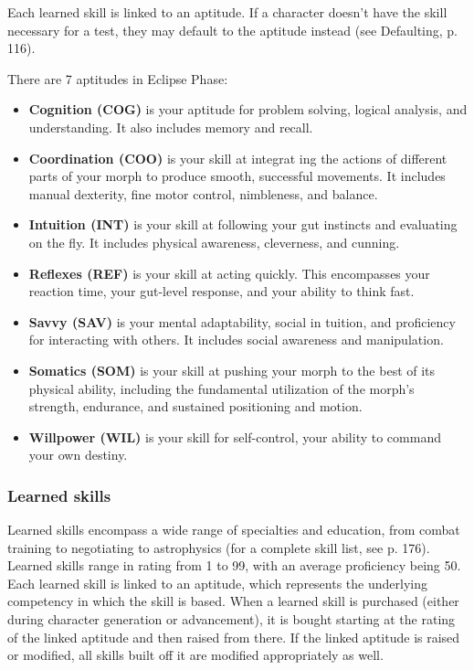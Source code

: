 Each learned skill is linked to an aptitude. If a character doesn't have the skill necessary for a test, they may default to the aptitude instead (see Defaulting, p. 116).

There are 7 aptitudes in Eclipse Phase:

\begin{itemize}
\item \textbf{Cognition (COG)} is your aptitude for problem solving, logical analysis, and understanding. It also includes memory and recall.
\item \textbf{Coordination (COO)} is your skill at integrat ing the actions of different parts of your morph to produce smooth, successful movements. It includes manual dexterity, fine motor control, nimbleness, and balance.
\item \textbf{Intuition (INT)} is your skill at following your gut instincts and evaluating on the fly. It includes physical awareness, cleverness, and cunning.
\item \textbf{Reflexes (REF)} is your skill at acting quickly. This encompasses your reaction time, your gut-level response, and your ability to think fast.
\item \textbf{Savvy (SAV)} is your mental adaptability, social in tuition, and proficiency for interacting with others. It includes social awareness and manipulation.
\item \textbf{Somatics (SOM)} is your skill at pushing your morph to the best of its physical ability, including the fundamental utilization of the morph's strength, endurance, and sustained positioning and motion.
\item \textbf{Willpower (WIL)} is your skill for self-control, your ability to command your own destiny.
\end{itemize}

\subsubsection{Learned skills}
\label{sec:learned-skills}

Learned skills encompass a wide range of specialties and education, from combat training to negotiating to astrophysics (for a complete skill list, see p. 176). Learned skills range in rating from 1 to 99, with an average proficiency being 50. Each learned skill is linked to an aptitude, which represents the underlying competency in which the skill is based. When a learned skill is purchased (either during character generation or advancement), it is bought starting at the rating of the linked aptitude and then raised from there. If the linked aptitude is raised or modified, all skills built off it are modified appropriately as well.

